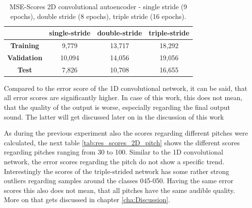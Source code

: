 \begin{table}[htb!]
    \centering
    \begin{tabular}{|c|c|c|c|}
        \hline
         & \textbf{single-stride} & \textbf{double-stride} & \textbf{triple-stride} \\
         \hline
        \textbf{Training} & 9,779 & 13,717 & 18,292 \\
        \hline
        \textbf{Validation} & 10,094 & 14,056 & 19,056 \\
        \hline
        \textbf{Test} & 7,826 & 10,708 & 16,655 \\
        \hline
    \end{tabular}
    \caption{MSE-Scores 2D convolutional autoencoder - single stride (9 epochs), double stride (8 epochs), triple stride (16 epochs).}
    \label{tab:res_scores_2Dcae}
\end{table}

Compared to the error score of the 1D convolutional network, it can be said, that all error scores are significantly higher. In case of this work, this does not mean, that the quality of the output is worse, especially regarding the final output sound. The latter will get discussed later on in the discussion of this work

As during the previous experiment also the scores regarding different pitches were calculated, the next table \ref{tab:res_scores_2D_pitch} shows the different scores regarding pitches ranging from 30 to 100. Similar to the 1D convolutional network, the error scores regarding the pitch do not show a specific trend. Interestingly the scores of the triple-strided network has some rather strong outliers regarding samples around the classes 045-050. Having the same error scores this also does not mean, that all pitches have the same audible quality. More on that gets discussed in chapter \ref{cha:Discussion}. 


